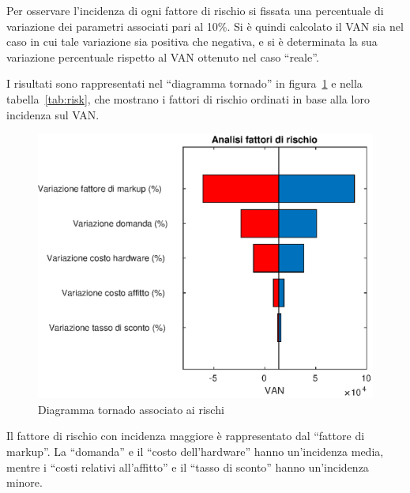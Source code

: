 Per osservare l’incidenza di ogni fattore di rischio si fissata una
percentuale di variazione dei parametri associati pari al 10\%. Si è quindi
calcolato il VAN sia nel caso in cui tale variazione sia positiva che negativa,
e si è determinata la sua variazione percentuale rispetto al VAN ottenuto nel
caso “reale”.

I risultati sono rappresentati nel “diagramma tornado” in figura~\ref{tornado} e
nella tabella~\ref{tab:risk}, che mostrano i fattori di rischio ordinati in base
alla loro incidenza sul VAN.

%
\begin{figure}[!h]
\centering
\includegraphics[width=\textwidth]{figures/tornado}
\caption{Diagramma tornado associato ai rischi}
\label{tornado}
\end{figure}
%
Il fattore di rischio con incidenza maggiore è rappresentato dal “fattore
di markup”. La “domanda” e il “costo dell’hardware” hanno un’incidenza media,
mentre i “costi relativi all’affitto” e il “tasso di sconto” hanno un’incidenza
minore.
